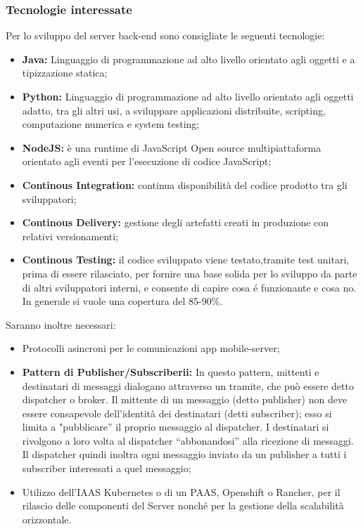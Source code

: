 	\subsubsection{Tecnologie interessate}
		Per lo sviluppo del server back-end sono consigliate le seguenti tecnologie:
		\begin{itemize}
			\item \textbf{Java:} Linguaggio di programmazione ad alto livello orientato agli oggetti e a tipizzazione statica;
			\item \textbf{Python:} Linguaggio di programmazione ad alto livello orientato agli oggetti adatto, tra gli altri usi, a sviluppare applicazioni distribuite, scripting, computazione numerica e system testing;
			\item \textbf{NodeJS:} è una runtime di JavaScript Open source multipiattaforma orientato agli eventi per l'esecuzione di codice JavaScript;
			\item \textbf{Continous Integration:} continua disponibilità del codice prodotto tra gli sviluppatori;
			\item \textbf{Continous Delivery:} gestione degli artefatti creati in produzione con relativi versionamenti;
			\item \textbf{Continous Testing:} il codice sviluppato viene testato,tramite test unitari, prima di essere rilasciato, per fornire una base solida per lo sviluppo da parte di altri sviluppatori interni, e consente di capire cosa é funzionante e cosa no. In generale si vuole una copertura del 85-90\%.
		\end{itemize}
		Saranno inoltre necessari:
		\begin{itemize}
			\item Protocolli asincroni per le comunicazioni app mobile-server;
			\item \textbf{Pattern di Publisher/Subscriberii:} In questo pattern, mittenti e destinatari di messaggi dialogano attraverso un tramite, che può essere detto dispatcher o broker. Il mittente di un messaggio (detto publisher) non deve essere consapevole dell'identità dei destinatari (detti subscriber); esso si limita a "pubblicare'' il proprio messaggio al dispatcher. I destinatari si rivolgono a loro volta al dispatcher ``abbonandosi'' alla ricezione di messaggi. Il dispatcher quindi inoltra ogni messaggio inviato da un publisher a tutti i subscriber interessati a quel messaggio;
			\item Utilizzo dell’IAAS Kubernetes o di un PAAS, Openshift o Rancher, per il rilascio delle componenti del Server nonché per la gestione della scalabilità orizzontale.
		\end{itemize}

